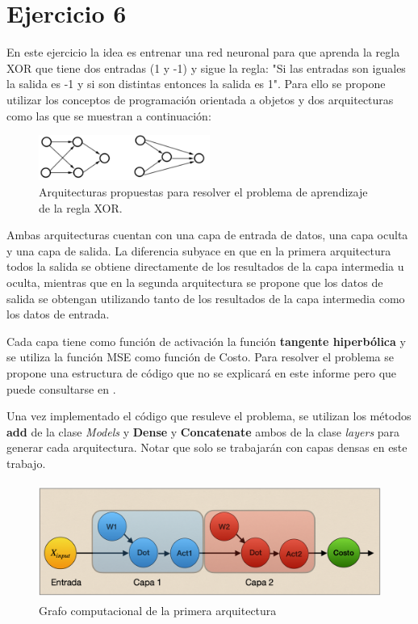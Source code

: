 \section{Ejercicio 6}

En este ejercicio la idea es entrenar una red neuronal para que aprenda la regla XOR que tiene dos entradas (1 y -1) y sigue la regla: "Si las entradas son iguales la salida es -1 y si son distintas entonces la salida es 1". Para ello se propone utilizar los conceptos de programación orientada a objetos y dos arquitecturas como las que se muestran a continuación:

\begin{figure}[H]
    \centering
    \includegraphics[width=0.5\textwidth]{image/archs.png}
    \caption{Arquitecturas propuestas para resolver el problema de aprendizaje de la regla XOR.}
    \label{fig:archs}
\end{figure}

Ambas arquitecturas cuentan con una capa de entrada de datos, una capa oculta y una capa de salida. La diferencia subyace en que en la primera arquitectura todos la salida se obtiene directamente de los resultados de la capa intermedia u oculta, mientras que en la segunda arquitectura se propone que los datos de salida se obtengan utilizando tanto de los resultados de la capa intermedia como los datos de entrada.

Cada capa tiene como función de activación la función \textbf{tangente hiperbólica} y se utiliza la función MSE como función de Costo. 
Para resolver el problema se propone una estructura de código que no se explicará en este informe pero que puede consultarse en \cite{tomas2}.

Una vez implementado el código que resuleve el problema, se utilizan los métodos \textbf{add} de la clase \textit{Models} y \textbf{Dense} y \textbf{Concatenate} ambos de la clase \textit{layers} para generar cada arquitectura. Notar que solo se trabajarán con capas densas en este trabajo.

\begin{figure}[H]
    \centering
    \includegraphics[height=1.5in]{image/graph_8_a.png}
    \caption{Grafo computacional de la primera arquitectura}
    \label{fig:graph6a}
\end{figure}

